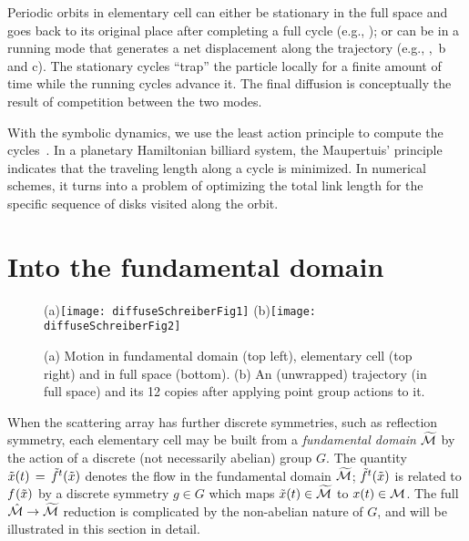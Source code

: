 \documentclass[aps,pre,
                showpacs,
                twocolumn,
                groupedaddress,
                floatfix]{revtex4-1}
\begin{document}
Periodic orbits in elementary cell can either be stationary in the full space
and goes back to its original place after completing a full cycle (e.g.,
); or can be in a running mode that generates a net displacement along
the trajectory (e.g., , \,b and c).
The stationary cycles ``trap'' the  particle locally for a finite amount of time
while the running cycles advance it. The final diffusion 
is conceptually the result of competition between the two modes.

With the symbolic dynamics, we use the least action principle to compute the 
cycles~. In a planetary Hamiltonian billiard system, the 
Maupertuis' principle indicates that the traveling length along a cycle is 
minimized. In numerical schemes, it turns into a problem of optimizing the 
total link length for the specific sequence of disks visited along the orbit. 


\section{Into the fundamental domain}
\label{s-SymmetryReduction}
\begin{figure}[htbp]
  \begin{center}
    (a)\texttt{[image: diffuseSchreiberFig1]}
    (b)\texttt{[image: diffuseSchreiberFig2]}
  \end{center}
  \caption[]{\label{fig-schrieberFig12} (a) Motion in fundamental domain (top 
  left), elementary cell (top right) and
  in full space (bottom). (b) An (unwrapped) trajectory (in full
  space) and its 12 copies after applying point group actions to it. 
  }
\end{figure}


When the scattering array has further discrete symmetries, such as reflection
symmetry, each elementary cell may be built from a {\em fundamental domain}
${\widetilde {{\cal M}}}$ by the action of a discrete (not necessarily abelian) group
$G$. The quantity $\tilde x(t)\,=\,{\tilde{f}^{t}(\tilde x)}$ denotes the flow in the
fundamental domain ${\widetilde {{\cal M}}}$; ${\tilde{f}^{t}(\tilde x)}$ is related to
${f^{}(\tilde x)}$ by a discrete symmetry $g \in G$ which maps $\tilde x(t)\in
{\widetilde {\ensuremath{{\cal M}}}}$ to ${x}(t) \in {\ensuremath{{\cal M}}}$. The full $\hat {{\cal M}} \rightarrow {\widetilde
{\ensuremath{{\cal M}}}}$ reduction is complicated by the non-abelian nature of $G$, and will be
illustrated in this section in detail.
\end{document}
